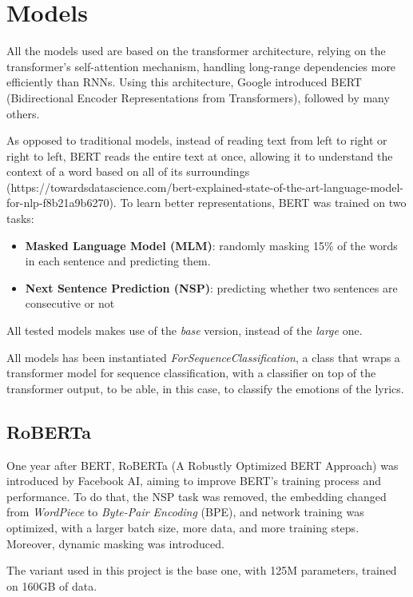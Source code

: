 \documentclass[11pt]{article}
\begin{document}
\section{Models}

All the models used are based on the transformer architecture, relying on the transformer's self-attention mechanism, handling long-range dependencies more efficiently than RNNs. Using this architecture, Google introduced BERT (Bidirectional Encoder Representations from Transformers), followed by many others.

As opposed to traditional models, instead of reading text from left to right or right to left, BERT reads the entire text at once, allowing it to understand the context of a word based on all of its surroundings (https://towardsdatascience.com/bert-explained-state-of-the-art-language-model-for-nlp-f8b21a9b6270). To learn better representations, BERT was trained on two tasks:

\begin{itemize}
  \setlength\itemsep{0.05em}
  \item \textbf{Masked Language Model (MLM)}: randomly masking 15\% of the words in each sentence and predicting them.
  \item \textbf{Next Sentence Prediction (NSP)}: predicting whether two sentences are consecutive or not 
\end{itemize}

All tested models makes use of the \textit{base} version, instead of the \textit{large} one.

All models has been instantiated \textit{ForSequenceClassification}, a class that wraps a transformer model for sequence classification, with a classifier on top of the transformer output, to be able, in this case, to classify the emotions of the lyrics.

\subsection{RoBERTa}

One year after BERT, RoBERTa (A Robustly Optimized BERT Approach) was introduced by Facebook AI, aiming to improve BERT's training process and performance. To do that, the NSP task was removed, the embedding changed from \textit{WordPiece} to \textit{Byte-Pair Encoding} (BPE), and network training was optimized, with a larger batch size, more data, and more training steps. Moreover, dynamic masking was introduced.

The variant used in this project is the base one, with 125M parameters, trained on 160GB of data.
\end{document}
